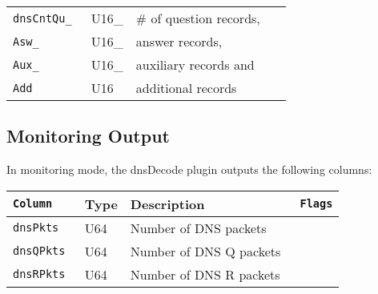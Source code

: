 \documentclass[documentation]{subfiles}
\begin{document}
\begin{longtable}{>{\tt}lll>{\tt\small}l}
    dnsCntQu\_                                    & U16\_        & \# of question records,                                      & \\
    \quad Asw\_                                   & \quad U16\_  & \quad answer records,                                        & \\
    \quad Aux\_                                   & \quad U16\_  & \quad auxiliary records and                                  & \\
    \quad Add                                     & \quad U16    & \quad additional records                                     & \\
    \bottomrule
\end{longtable}

\subsection{Monitoring Output}
In monitoring mode, the dnsDecode plugin outputs the following columns:
\begin{longtable}{>{\tt}lll>{\tt\small}l}
    \toprule
    {\bf Column} & {\bf Type} & {\bf Description}       & {\bf Flags}\\
    \midrule\endhead%
    dnsPkts      & U64        & Number of DNS packets   & \\
    dnsQPkts     & U64        & Number of DNS Q packets & \\
    dnsRPkts     & U64        & Number of DNS R packets & \\
    \bottomrule
\end{longtable}
\end{document}

